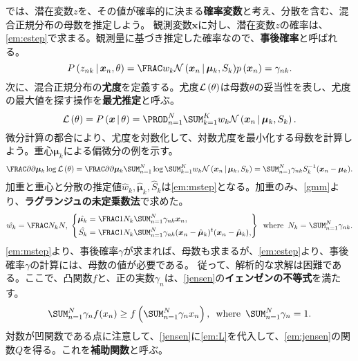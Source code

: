 \documentclass[10pt,a4paper]{book}
\begin{document}
では、潜在変数$z$を、その値が確率的に決まる\textbf{確率変数}と考え、分散を含む、混合正規分布の母数を推定しよう。
観測変数$\bm{x}$に対し、潜在変数$z$の確率は、\eqref{em:estep}で求まる。観測量に基づき推定した確率なので、\textbf{事後確率}と呼ばれる。
%
\begin{equation}
\label{eq:em:estep}
\Prob{z_{nk}}[\bm{x}_n,\theta] = \frac{w_k \Nd{\bm{x}_n}{\bm{\mu}_k,S_k}}{\prob{\bm{x}_n}} = \gamma_{nk}.
\end{equation}
%
次に、混合正規分布の\textbf{尤度}を定義する。尤度$\mathcal{L}\left(\theta\right)$は母数$\theta$の妥当性を表し、尤度の最大値を探す操作を\textbf{最尤推定}と呼ぶ。
%
\begin{equation}
\label{eq:em:L}
\Lk{\theta} =
\Prob{\bm{x}}[\theta] =
\prod_{n=1}^N \sum_{k=1}^K w_k \Nd{\bm{x}_n}{\bm{\mu}_k,S_k}.
\end{equation}
%
微分計算の都合により、尤度を対数化して、対数尤度を最小化する母数を計算しよう。重心$\bm{\mu}_k$による偏微分の例を示す。
%
\begin{equation}
\label{eq:em:L:m}
\pdiff{}{\bm{\mu}_k}\log\Lk{\theta} =
\pdiff{}{\bm{\mu}_k}\sum_{n=1}^N \log\sum_{k=1}^K w_k \Nd{\bm{x}_n}{\bm{\mu}_k,S_k} =
\sum_{n=1}^N \gamma_{nk} S_k^{-1} (\bm{x}_n - \bm{\mu}_k).
\end{equation}
%
加重と重心と分散の推定値$\hat{w}_k,\hat{\bm{\mu}}_k,\hat{S}_k$は\eqref{em:mstep}となる。加重のみ、\eqref{gmm}より、\textbf{ラグランジュの未定乗数法}で求めた。
%
\begin{equation}
\label{eq:em:mstep}
\hat{w_k} = \frac{N_k}{N},\esp
\left\{
\begin{aligned}
\hat{\bm{\mu}_k} &= \frac{1}{N_k} \sum_{n=1}^N \gamma_{nk} \bm{x}_n,\\
\hat{S_k} &= \frac{1}{N_k} \sum_{n=1}^N \gamma_{nk} (\bm{x}_n - \hat{\bm{\mu}}_k) \trans{(\bm{x}_n - \hat{\bm{\mu}}_k)},
\end{aligned}
\right\}
\where
N_k = \sum_{n=1}^N \gamma_{nk}.
\end{equation}
%
\eqref{em:mstep}より、事後確率$\gamma$が求まれば、母数も求まるが、\eqref{em:estep}より、事後確率$\gamma$の計算には、母数の値が必要である。
従って、解析的な求解は困難である。ここで、凸関数$f$と、正の実数$\gamma_n$は、\eqref{jensen}の\textbf{イェンゼンの不等式}を満たす。
%
\begin{equation}
\label{eq:jensen}
\sum_{n=1}^N \gamma_n f(x_n) \geq f\tup{\sum_{n=1}^N \gamma_n x_n},
\where
\sum_{n=1}^N \gamma_n=1.
\end{equation}
%
対数が凹関数である点に注意して、\eqref{jensen}に\eqref{em:L}を代入して、\eqref{em:jensen}の関数$Q$を得る。これを\textbf{補助関数}と呼ぶ。
\end{document}
